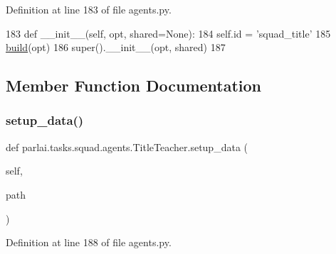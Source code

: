 Definition at line 183 of file agents.\+py.


\begin{DoxyCode}
183     \textcolor{keyword}{def }\_\_init\_\_(self, opt, shared=None):
184         self.id = \textcolor{stringliteral}{'squad\_title'}
185         \hyperlink{namespaceparlai_1_1mturk_1_1tasks_1_1talkthewalk_1_1download_a8c0fbb9b6dfe127cb8c1bd6e7c4e33fd}{build}(opt)
186         super().\_\_init\_\_(opt, shared)
187 
\end{DoxyCode}


\subsection{Member Function Documentation}
\mbox{\label{classparlai_1_1tasks_1_1squad_1_1agents_1_1TitleTeacher_af60b7813cbea1681237c9290a64489ef}} 
\subsubsection{\texorpdfstring{setup\+\_\+data()}{setup\_data()}}
{\footnotesize\ttfamily def parlai.\+tasks.\+squad.\+agents.\+Title\+Teacher.\+setup\+\_\+data (\begin{DoxyParamCaption}\item[{}]{self,  }\item[{}]{path }\end{DoxyParamCaption})}



Definition at line 188 of file agents.\+py.


